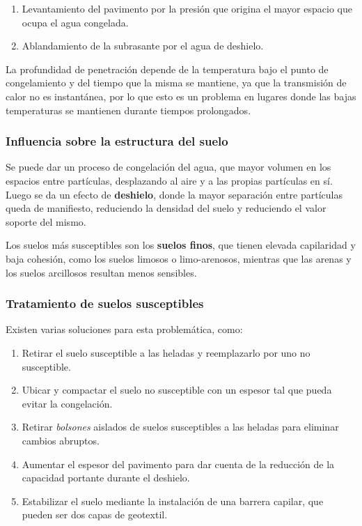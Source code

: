 \documentclass[../main.tex]{subfiles}
\begin{document}
\begin{enumerate}
  \item Levantamiento del pavimento por la presión que origina el mayor espacio
    que ocupa el agua congelada.
  \item Ablandamiento de la subrasante por el agua de deshielo.
\end{enumerate}

La profundidad de penetración depende de la temperatura bajo el punto de
congelamiento y del tiempo que la misma se mantiene, ya que la transmisión de 
calor no es instantánea, por lo que esto es un problema en lugares donde las 
bajas temperaturas se mantienen durante tiempos prolongados.

\subsubsection{Influencia sobre la estructura del suelo}

Se puede dar un proceso de congelación del agua, que mayor volumen en los
espacios entre partículas, desplazando al aire y a las propias partículas en sí.
Luego se da un efecto de \textbf{deshielo}, donde la mayor separación entre partículas
queda de manifiesto, reduciendo la densidad del suelo y reduciendo el valor
soporte del mismo.

Los suelos más susceptibles son los \textbf{suelos finos}, que tienen elevada
capilaridad y baja cohesión, como los suelos limosos o limo-arenosos, mientras
que las arenas y los suelos arcillosos resultan menos sensibles.

\subsubsection{Tratamiento de suelos susceptibles}

Existen varias soluciones para esta problemática, como:

\begin{enumerate}
  \item Retirar el suelo susceptible a las heladas y reemplazarlo por uno no
    susceptible.
  \item Ubicar y compactar el suelo no susceptible con un espesor tal que pueda
    evitar la congelación.
  \item Retirar \textit{bolsones} aislados de suelos susceptibles a las heladas
    para eliminar cambios abruptos.
  \item Aumentar el espesor del pavimento para dar cuenta de la reducción de la 
    capacidad portante durante el deshielo.
  \item Estabilizar el suelo mediante la instalación de una barrera capilar, que 
    pueden ser dos capas de geotextil.
\end{enumerate}
\end{document}
